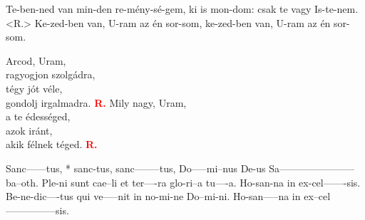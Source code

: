 \documentclass[twoside]{article}
\begin{document}
\begin{gregosheet}
            {   Te-ben-ned van  min-den re-mény-sé-gem, ki is mon-dom: csak te vagy Is-te-nem. <R.> Ke-zed-ben van, U-ram az én sor-som, ke-zed-ben van,  U-ram az én sor-som.}
\end{gregosheet}

\begin{hymnstanzas}
    Arcod, Uram,\\
    ragyogjon szolgádra,\\
    tégy jót véle,\\
    gondolj irgalmadra. \textcolor{red}{\textbf{R.}}
\stanzabreak
    Mily nagy, Uram,\\
    a te édességed,\\
    azok iránt,\\
    akik félnek téged. \textcolor{red}{\textbf{R.}}
\end{hymnstanzas}

\begin{gregosheet}
            {   Sanc------tus, * sanc-tus,   sanc--------tus,   Do-----mi--nus De-us  Sa-----------------------ba--oth. Ple-ni sunt cae--li et ter----ra     glo-ri--a  tu----a.   Ho-san-na  in ex-cel-------sis.   Be-ne-dic----tus qui ve-----nit    in no-mi-ne Do--mi-ni.  Ho-san-----na    in ex--cel---------------sis.}
\end{gregosheet}
\end{document}

